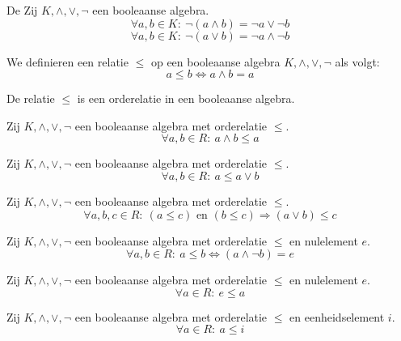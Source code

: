\documentclass[main.tex]{subfiles}
\begin{document}
\begin{st}
  \label{st:wetten-van-de-morgan}
  De 
  Zij $K,\wedge,\vee,\neg$ een booleaanse algebra.
  \[ \forall a,b \in K:\ \neg(a \wedge b) = \neg a \vee \neg b\]
  \[ \forall a,b \in K:\ \neg(a \vee b) = \neg a \wedge \neg b\]
\end{st}

\begin{de}
  We definieren een relatie $\le$ op een booleaanse algebra $K,\wedge,\vee,\neg$ als volgt:
  \[ a \le b \Leftrightarrow a \wedge b = a \]
\end{de}

\begin{st}
  De relatie $\le$ is een orderelatie in een booleaanse algebra.
\end{st}


\begin{st}
  Zij $K,\wedge,\vee,\neg$ een booleaanse algebra met orderelatie $\le$.
  \[ \forall a,b \in R:\ a\wedge b \le a \]
\end{st}

\begin{st}
  Zij $K,\wedge,\vee,\neg$ een booleaanse algebra met orderelatie $\le$.
  \[ \forall a,b \in R:\ a \le a \vee b \]
\end{st}

\begin{st}
  Zij $K,\wedge,\vee,\neg$ een booleaanse algebra met orderelatie $\le$.
  \[ \forall a,b,c \in R:\ (a \le c) \text{ en } (b \le c) \Rightarrow (a \vee b) \le c \]
\end{st}

\begin{st}
  Zij $K,\wedge,\vee,\neg$ een booleaanse algebra met orderelatie $\le$ en nulelement $e$.
  \[ \forall a,b \in R:\ a \le b \Leftrightarrow (a \wedge \neg b) = e \]
\end{st}

\begin{st}
  Zij $K,\wedge,\vee,\neg$ een booleaanse algebra met orderelatie $\le$ en nulelement $e$.
  \[ \forall a \in R:\ e \le a \]
\end{st}

\begin{st}
  Zij $K,\wedge,\vee,\neg$ een booleaanse algebra met orderelatie $\le$ en eenheidselement $i$.
  \[ \forall a \in R:\ a \le i \]
\end{st}
\end{document}
